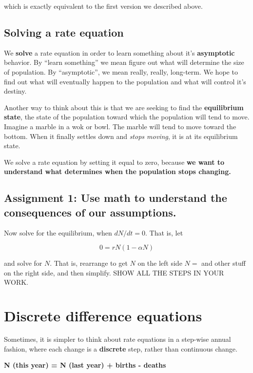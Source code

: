 \documentclass[
  letterpaper,
  DIV=11,
  numbers=noendperiod]{scrreprt}
\begin{document}
which is exactly equivalent to the first version we described above.

\subsection{Solving a rate equation}\label{solving-a-rate-equation}

We \textbf{solve} a rate equation in order to learn something about it's
\textbf{asymptotic} behavior. By ``learn something'' we mean figure out
what will determine the size of population. By ``asymptotic'', we mean
really, really, long-term. We hope to find out what will eventually
happen to the population and what will control it's destiny.

Another way to think about this is that we are seeking to find the
\textbf{equilibrium state}, the state of the population toward which the
population will tend to move. Imagine a marble in a wok or bowl. The
marble will tend to move toward the bottom. When it finally settles down
and \emph{stops moving}, it is at its equilibrium state.

We solve a rate equation by setting it equal to zero, because \textbf{we
want to understand what determines when the population stops changing.}

\subsection{Assignment 1: Use math to understand the consequences of our
assumptions.}\label{assignment-1-use-math-to-understand-the-consequences-of-our-assumptions.}

Now solve for the equilibrium, when \(dN/dt = 0\). That is, let

\[0 = rN\left(1-\alpha N\right)\]

and solve for \(N\). That is, rearrange to get \(N\) on the left side
\(N=\) and other stuff on the right side, and then simplify. SHOW ALL
THE STEPS IN YOUR WORK.

\section{Discrete difference
equations}\label{discrete-difference-equations}

Sometimes, it is simpler to think about rate equations in a step-wise
annual fashion, where each change is a \textbf{discrete} step, rather
than continuous change.

\textbf{N (this year) = N (last year) + births - deaths}
\end{document}

